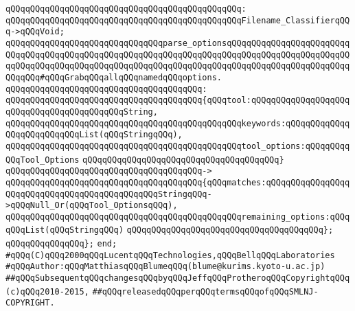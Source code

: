 \verb|qQQqqQQqqQQqqQQqqQQqqQQqqQQqqQQqqQQqqQQqqQQqqQQq:|\newline
\verb|qQQqqQQqqQQqqQQqqQQqqQQqqQQqqQQqqQQqqQQqqQQqqQQqFilename_ClassifierqQQq->qQQqVoid;|\newline
\newline
\newline
\verb|qQQqqQQqqQQqqQQqqQQqqQQqqQQqqQQqparse_optionsqQQqqQQqqQQqqQQqqQQqqQQqqQQqqQQqqQQqqQQqqQQqqQQqqQQqqQQqqQQqqQQqqQQqqQQqqQQqqQQqqQQqqQQqqQQqqQQqqQQqqQQqqQQqqQQqqQQqqQQqqQQqqQQqqQQqqQQqqQQqqQQqqQQqqQQqqQQqqQQqqQQqqQQqqQQq#qQQqGrabqQQqallqQQqnamedqQQqoptions.|\newline
\verb|qQQqqQQqqQQqqQQqqQQqqQQqqQQqqQQqqQQqqQQq:|\newline
\verb|qQQqqQQqqQQqqQQqqQQqqQQqqQQqqQQqqQQqqQQq{qQQqtool:qQQqqQQqqQQqqQQqqQQqqQQqqQQqqQQqqQQqqQQqqQQqString,|\newline
\verb|qQQqqQQqqQQqqQQqqQQqqQQqqQQqqQQqqQQqqQQqqQQqqQQqkeywords:qQQqqQQqqQQqqQQqqQQqqQQqqQQqList(qQQqStringqQQq),|\newline
\verb|qQQqqQQqqQQqqQQqqQQqqQQqqQQqqQQqqQQqqQQqqQQqqQQqtool_options:qQQqqQQqqQQqTool_Options|\newline
\verb|qQQqqQQqqQQqqQQqqQQqqQQqqQQqqQQqqQQqqQQq}|\newline
\verb|qQQqqQQqqQQqqQQqqQQqqQQqqQQqqQQqqQQqqQQq->|\newline
\verb|qQQqqQQqqQQqqQQqqQQqqQQqqQQqqQQqqQQqqQQq{qQQqmatches:qQQqqQQqqQQqqQQqqQQqqQQqqQQqqQQqqQQqqQQqqQQqqQQqStringqQQq->qQQqNull_Or(qQQqTool_OptionsqQQq),|\newline
\verb|qQQqqQQqqQQqqQQqqQQqqQQqqQQqqQQqqQQqqQQqqQQqqQQqremaining_options:qQQqqQQqList(qQQqStringqQQq)|\newline
\verb|qQQqqQQqqQQqqQQqqQQqqQQqqQQqqQQqqQQqqQQq};|\newline
\verb|qQQqqQQqqQQqqQQq};|\newline
\verb|end;|\newline
\newline
\newline
\verb|#qQQq(C)qQQq2000qQQqLucentqQQqTechnologies,qQQqBellqQQqLaboratories|\newline
\verb|#qQQqAuthor:qQQqMatthiasqQQqBlumeqQQq(blume@kurims.kyoto-u.ac.jp)|\newline
\verb|##qQQqSubsequentqQQqchangesqQQqbyqQQqJeffqQQqProtheroqQQqCopyrightqQQq(c)qQQq2010-2015,|\newline
\verb|##qQQqreleasedqQQqperqQQqtermsqQQqofqQQqSMLNJ-COPYRIGHT.|\newline

